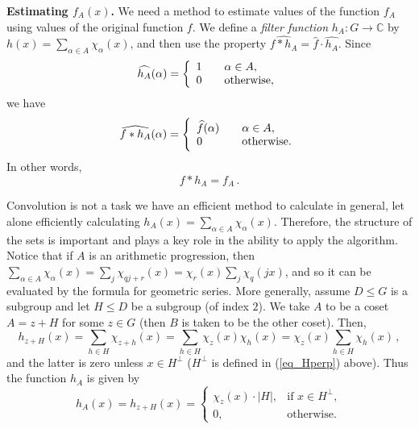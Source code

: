 \documentclass[11pt]{article}
\theoremstyle{definition}
\newcommand{\C}{\mathbb{C}}
\begin{document}
\noindent \textbf{Estimating $f_A(x)$.} We need a method to estimate values of the function $f_A$ using values of the original function $f$.
We define a \emph{filter function} $h_A: G \to \C$ by $h(x) = \sum_{\alpha \in A} \chi_\alpha(x)$, and then use the property $\widehat{f \ast h_A} = \widehat{f} \cdot \widehat{h_A}$.
Since
\[ \widehat{h_A}(\alpha) = \left\{
    \begin{array}{l l}
        1 & \quad \alpha \in A,       \\
        0 & \quad \mathrm{otherwise,}
    \end{array}
    \right. \]
we have
\[\widehat{f \ast h_A}(\alpha) = \left\{
    \begin{array}{l l}
        \widehat{f}(\alpha) & \quad \alpha \in A,       \\
        0                   & \quad \mathrm{otherwise.}
    \end{array}
    \right.\]
In other words,
\begin{equation}\label{eq:conv}
    f \ast h_A = f_A \, .
\end{equation}
%

Convolution is not a task we have an efficient method to calculate in general, let alone efficiently calculating $h_A(x) = \sum_{\alpha \in A} \chi_\alpha(x)$. Therefore, the structure of the sets is important and plays a key role in the ability to apply the algorithm. Notice that if $A$ is an arithmetic progression, then $\sum_{\alpha \in A} \chi_\alpha(x) = \sum_j \chi_{qj+r}(x) = \chi_r(x) \sum_j \chi_q(jx)$, and so it can be evaluated by the formula for geometric series. More generally, assume $D \leq G$ is a subgroup and let $H \leq D$ be a subgroup (of index $2$). We take $A$ to be a coset $A = z+H$ for some $z\in G$ (then $B$ is taken to be the other coset). Then,
\[ h_{z+H}(x) = \sum_{h\in H}\chi_{z+h}(x) =\sum_{h\in H}\chi_z(x)\chi_h(x) = \chi_z(x)\sum_{h\in H}\chi_h(x) \,,\]
and the latter is zero unless $x \in H^\perp$ ($H^\perp$ is defined in (\ref{eq_Hperp}) above). Thus the function $h_A$ is given by
\begin{equation} \label{filter}
    h_A(x) = h_{z+H}(x) = \begin{cases} \chi_z(x)\cdot |H|, & \text{if }x\in H^\perp, \\ 0, &\text{otherwise.}\end{cases}
\end{equation}
\end{document}
